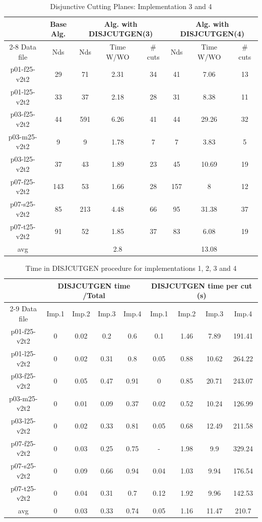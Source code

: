 \begin{table}[!htbp]
\centering
\caption{Disjunctive Cutting Planes: Implementation 3 and 4 }\label{tab:disj-imp34}
\begin {tabular}[!h]{|c|c|c|c|c|c|c|c|}
\hline
\mbox{} & Base Alg. & \multicolumn{3}{|c|}{Alg. with DISJCUTGEN(3)} & \multicolumn{3}{|c|}{Alg. with DISJCUTGEN(4)} \\\cline{2-8}
Data file & Nds  & Nds & Time W/WO & \# cuts & Nds & Time W/WO & \# cuts \\\hline
p01-f25-v2t2 &  29  & 71    & 2.31  & 34    & 41    & 7.06  & 13 \\
p01-l25-v2t2 &  33  & 37    & 2.18  & 28    & 31    & 8.38  & 11 \\
p03-f25-v2t2 &  44  & 591   & 6.26  & 41    & 44    & 29.26 & 32 \\
p03-m25-v2t2 &  9   & 9 & 1.78  & 7 & 7 & 3.83  & 5 \\
p03-l25-v2t2 &  37  & 43    & 1.89  & 23    & 45    & 10.69 & 19 \\
p07-f25-v2t2 &  143 & 53    & 1.66  & 28    & 157   & 8 & 12 \\
p07-s25-v2t2 &  85  & 213   & 4.48  & 66    & 95    & 31.38 & 37 \\
p07-t25-v2t2 &  91  & 52    & 1.85  & 37    & 83    & 6.08  & 19 \\\hline
avg & \mbox{} & \mbox{}& 2.8 & \mbox{}& \mbox{} & 13.08 & \mbox{} \\\hline
\end{tabular}
\end{table}

\begin{table}[!htbp]
\centering
\caption{Time in DISJCUTGEN procedure for implementations 1, 2, 3 and 4 }\label{tab:disj-time}
\begin {tabular}[!h]{|c|c|c|c|c|c|c|c|c|}
\hline
\mbox{} & \multicolumn{4}{|c|}{DISJCUTGEN time /Total } & \multicolumn{4}{|c|}{DISJCUTGEN time per cut (s)} \\\cline{2-9}
Data file & Imp.1  & Imp.2  & Imp.3  & Imp.4 & Imp.1  & Imp.2  & Imp.3  & Imp.4 \\\hline
p01-f25-v2t2 & 0 & 0.02 & 0.2   & 0.6   & 0.1   & 1.46  & 7.89  & 191.41 \\
p01-l25-v2t2 & 0 & 0.02 & 0.31  & 0.8   & 0.05  & 0.88  & 10.62 & 264.22 \\
p03-f25-v2t2 & 0 & 0.05 & 0.47  & 0.91  & 0 & 0.85  & 20.71 & 243.07 \\
p03-m25-v2t2 & 0 & 0.01 & 0.09  & 0.37  & 0.02  & 0.52  & 10.24 & 126.99 \\
p03-l25-v2t2 & 0 & 0.02 & 0.33  & 0.81  & 0.05  & 0.68  & 12.49 & 211.58 \\
p07-f25-v2t2 & 0 & 0.03 & 0.25  & 0.75  &  -    & 1.98  & 9.9   & 329.24 \\
p07-s25-v2t2 & 0 & 0.09 & 0.66  & 0.94  & 0.04  & 1.03  & 9.94  & 176.54 \\
p07-t25-v2t2 & 0 & 0.04 & 0.31  & 0.7   & 0.12  & 1.92  & 9.96  & 142.53 \\\hline
avg & 0 & 0.03 & 0.33 & 0.74 & 0.05 & 1.16  & 11.47 & 210.7 \\\hline
\end{tabular}
\end{table}

